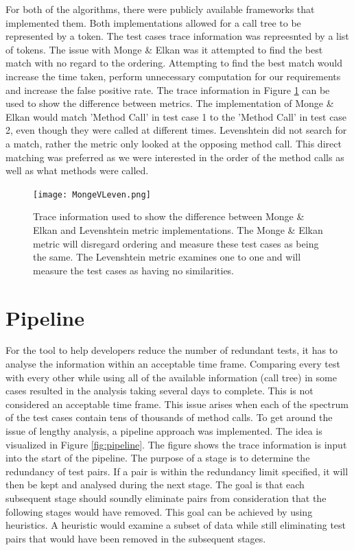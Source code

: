 For both of the algorithms, there were publicly available frameworks that implemented them. Both implementations allowed for a call tree to be represented by a token. The test cases trace information was repreesnted by a list of tokens. The issue with Monge \& Elkan was it attempted to find the best match with no regard to the ordering. Attempting to find the best match would increase the time taken, perform unnecessary computation for our requirements and increase the false positive rate. The trace information in Figure \ref{fig:mongevleven} can be used to show the difference between metrics. The implementation of Monge \& Elkan would match 'Method Call' in test case 1 to the 'Method Call' in test case 2, even though they were called at different times. Levenshtein did not search for a match, rather the metric only looked at the opposing method call. This direct matching was preferred as we were interested in the order of the method calls as well as what methods were called.

\begin{figure}[h]
\begin{center}
\texttt{[image: MongeVLeven.png]}
\end{center}
\caption{Trace information used to show the difference between Monge \& Elkan and Levenshtein metric implementations. The Monge \& Elkan metric will disregard ordering and measure these test cases as being the same. The Levenshtein metric examines one to one and will measure the test cases as having no similarities.}
\label{fig:mongevleven}
\end{figure}

\section{Pipeline }
\label{pipelinesection}
For the tool to help developers reduce the number of redundant tests, it has to analyse the information within an acceptable time frame. Comparing every test with every other while using all of the available information (call tree) in some cases resulted in the analysis taking several days to complete. This is not considered an acceptable time frame. This issue arises when each of the spectrum of the test cases contain tens of thousands of method calls. To get around the issue of lengthy analysis, a pipeline approach was implemented. The idea is visualized in Figure \ref{fig:pipeline}. The figure shows the trace information is input into the start of the pipeline. The purpose of a stage is to determine the redundancy of test pairs. If a pair is within the redundancy limit specified, it will then be kept and analysed during the next stage. The goal is that each subsequent stage should soundly eliminate pairs from consideration that the following stages would have removed. This goal can be achieved by using heuristics. A heuristic would examine a subset of data while still eliminating test pairs that would have been removed in the subsequent stages. 

